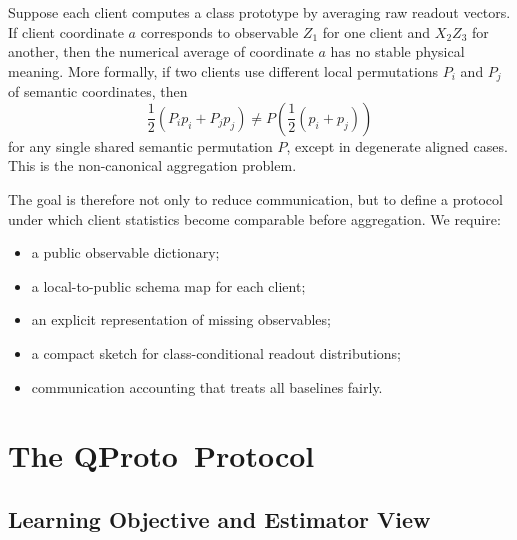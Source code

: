 \documentclass[preprint]{elsarticle}
\newcommand{\method}{QProto}
\begin{document}
Suppose each client computes a class prototype by averaging raw readout vectors. If client coordinate \(a\) corresponds to observable \(Z_1\) for one client and \(X_2Z_3\) for another, then the numerical average of coordinate \(a\) has no stable physical meaning. More formally, if two clients use different local permutations \(P_i\) and \(P_j\) of semantic coordinates, then
\begin{equation}
    \frac{1}{2}(P_i p_i + P_j p_j)
    \neq
    P\left(\frac{1}{2}(p_i+p_j)\right)
\end{equation}
for any single shared semantic permutation \(P\), except in degenerate aligned cases. This is the non-canonical aggregation problem.

The goal is therefore not only to reduce communication, but to define a protocol under which client statistics become comparable before aggregation. We require:
\begin{itemize}
    \item a public observable dictionary;
    \item a local-to-public schema map for each client;
    \item an explicit representation of missing observables;
    \item a compact sketch for class-conditional readout distributions;
    \item communication accounting that treats all baselines fairly.
\end{itemize}

\section{The \method\ Protocol}

\subsection{Learning Objective and Estimator View}
\end{document}
